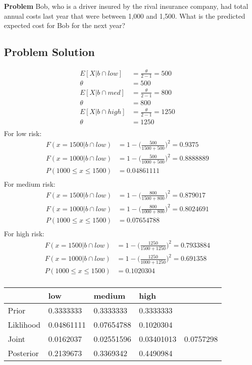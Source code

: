 \documentclass[12pt]{article}
\theoremstyle{definition}
\begin{document}
\bigskip
\noindent
{\bf Problem} Bob, who is a driver insured by the rival insurance company, had total annual costs last year that were between 1,000 and 1,500. What is the predicted expected cost for Bob for the next year?


\subsection*{Problem Solution}
\begin{align*}
E[X|b\cap low] &= \frac{\theta}{2 - 1} = 500\\
\theta &= 500\\
E[X|b\cap med] &= \frac{\theta}{2 - 1} = 800\\
\theta &= 800\\
E[X|b\cap high] &= \frac{\theta}{2 - 1} = 1250\\
\theta &= 1250\\
\end{align*}
For low risk:
\begin{align*}
F(x=1500|b\cap low) &= 1 - \biggr(\frac{500}{1500 + 500}\biggr)^2 = 0.9375\\
F(x=1000|b\cap low) &= 1 - \biggr(\frac{500}{1000 + 500}\biggr)^2 = 0.8888889\\
P(1000 \leq x \leq 1500) &= 0.04861111\\
\end{align*}
For medium risk:
\begin{align*}
F(x=1500|b\cap low) &= 1 - \biggr(\frac{800}{1500 + 800}\biggr)^2 = 0.879017\\
F(x=1000|b\cap low) &= 1 - \biggr(\frac{800}{1000 + 800}\biggr)^2 = 0.8024691\\
P(1000 \leq x \leq 1500) &= 0.07654788\\
\end{align*}
For high risk:
\begin{align*}
F(x=1500|b\cap low) &= 1 - \biggr(\frac{1250}{1500 + 1250}\biggr)^2 = 0.7933884\\
F(x=1000|b\cap low) &= 1 - \biggr(\frac{1250}{1000 + 1250}\biggr)^2 = 0.691358\\
P(1000 \leq x \leq 1500) &= 0.1020304\\
\end{align*}
\begin{tabular}{lllll}
&   low   &   medium   &   high   \\
\hline
Prior      &   0.3333333   &   0.3333333   &   0.3333333   &\\
Liklihood  &   0.04861111   &   0.07654788   &   0.1020304   &\\
Joint      &   0.0162037   &   0.02551596   &   0.03401013   &   0.0757298\\
Posterior  &   0.2139673   &   0.3369342   &   0.4490984   &\\
\hline
\end{tabular}\\\\
\end{document}
